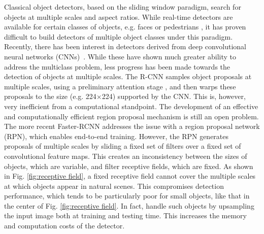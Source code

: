 \documentclass[runningheads]{llncs}
\begin{document}
Classical object detectors, based on the sliding window paradigm,
search for objects at multiple scales and aspect ratios. While real-time
detectors are available for certain classes of objects, e.g. faces or
pedestrians \cite{DBLP:journals/ijcv/ViolaJ04,DBLP:journals/pami/DollarABP14},
it has proven difficult to build detectors of multiple object classes
under this paradigm.
Recently, there has been interest in detectors derived from deep
convolutional neural networks (CNNs)~\cite{DBLP:conf/cvpr/GirshickDDM14,DBLP:conf/iccv/Girshick15,DBLP:conf/nips/XiaozhiNIPS15,DBLP:conf/eccv/HeZR014,DBLP:conf/iccv/GidarisK15}.  While these have shown much greater ability to address the
multiclass problem, less progress has been made towards the detection
of objects at multiple scales. The R-CNN \cite{DBLP:conf/cvpr/GirshickDDM14}
samples object proposals at multiple scales, using a preliminary attention
stage \cite{DBLP:conf/iccv/SandeUGS11}, and then warps these proposals to
the size (e.g. 224$\times$224) supported by the CNN. This is, however,
very inefficient from a computational standpoint. The development of
an effective and computationally efficient region proposal mechanism
is still an open problem. The more recent
Faster-RCNN \cite{DBLP:conf/nips/shaoqing15fasterRcnn} addresses the issue
with a region proposal network (RPN), which enables end-to-end
training. However, the RPN generates proposals of multiple scales by sliding a
fixed set of filters over a fixed set of convolutional feature maps.
This creates an inconsistency between the sizes of objects, which are
variable, and filter receptive fields, which are fixed. As shown in
Fig. \ref{fig:receptive field}, a fixed receptive field cannot cover
the multiple scales at which objects appear in natural scenes.
This compromises detection performance, which tends to be particularly poor
for small objects, like that in the center of Fig. \ref{fig:receptive field}.
In fact, \cite{DBLP:conf/iccv/Girshick15,DBLP:conf/nips/XiaozhiNIPS15,DBLP:conf/nips/shaoqing15fasterRcnn} handle such objects by upsampling the input
image both at training and testing time. This increases the memory
and computation costs of the detector.
\end{document}

